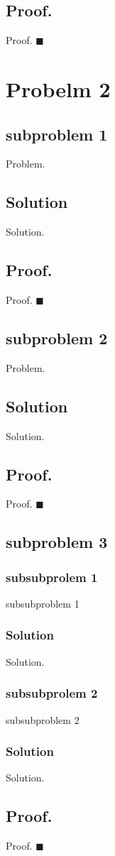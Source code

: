 \documentclass{article}
\begin{document}
 \subsection*{Proof.}
  	Proof.
 $ \blacksquare $
\section*{Probelm 2}
\subsection*{subproblem 1}
  Problem.
\subsection*{Solution}
  Solution.
 \subsection*{Proof.}
  Proof.
 $ \blacksquare $
\subsection*{subproblem 2}
  Problem.
\subsection*{Solution}
  Solution.
 \subsection*{Proof.}
  Proof.
 $ \blacksquare $
\subsection*{subproblem 3}
  	\subsubsection*{subsubprolem 1}
  	subsubproblem 1
	\subsubsection*{Solution}
  	Solution.
  	\subsubsection*{subsubprolem 2}
  	subsubproblem 2
	\subsubsection*{Solution}
  	Solution.
 \subsection*{Proof.}
  	Proof.
 $ \blacksquare $

\end{document}
